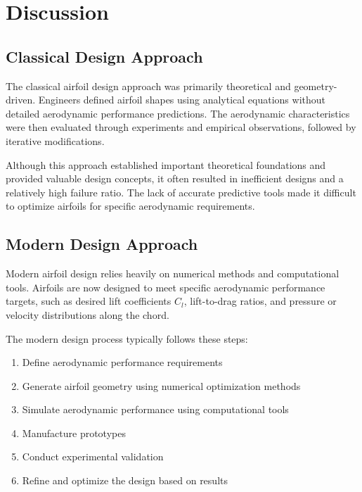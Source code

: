 
\section*{Discussion}



\subsection*{Classical Design Approach}

The classical airfoil design approach was primarily theoretical and geometry-driven. 
Engineers defined airfoil shapes using analytical equations without detailed aerodynamic performance predictions. 
The aerodynamic characteristics were then evaluated through experiments and empirical observations, followed by iterative modifications.

Although this approach established important theoretical foundations and provided valuable design concepts, 
it often resulted in inefficient designs and a relatively high failure ratio. The lack of accurate predictive tools made it difficult to optimize airfoils for specific aerodynamic requirements.


\subsection*{Modern Design Approach}

Modern airfoil design relies heavily on numerical methods and computational tools. 
Airfoils are now designed to meet specific aerodynamic performance targets, such as desired lift coefficients $C_l$, lift-to-drag ratios, and pressure or velocity distributions along the chord.

The modern design process typically follows these steps:

\begin{enumerate}
    \item Define aerodynamic performance requirements
    \item Generate airfoil geometry using numerical optimization methods
    \item Simulate aerodynamic performance using computational tools
    \item Manufacture prototypes
    \item Conduct experimental validation
    \item Refine and optimize the design based on results
\end{enumerate}

